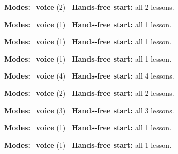 \expandafter\def\csname hlchaptermodality15\endcsname{%
  {\small\noindent
    \textbf{Modes:} \hlvoicesign{}~\textbf{voice} (2)\quad
    \hlvoicesign{}~\textbf{Hands-free start:} all 2 lessons.%
    \par}\medskip
}

\expandafter\def\csname hlchaptermodality16\endcsname{%
  {\small\noindent
    \textbf{Modes:} \hlvoicesign{}~\textbf{voice} (1)\quad
    \hlvoicesign{}~\textbf{Hands-free start:} all 1 lesson.%
    \par}\medskip
}

\expandafter\def\csname hlchaptermodality17\endcsname{%
  {\small\noindent
    \textbf{Modes:} \hlvoicesign{}~\textbf{voice} (1)\quad
    \hlvoicesign{}~\textbf{Hands-free start:} all 1 lesson.%
    \par}\medskip
}

\expandafter\def\csname hlchaptermodality18\endcsname{%
  {\small\noindent
    \textbf{Modes:} \hlvoicesign{}~\textbf{voice} (1)\quad
    \hlvoicesign{}~\textbf{Hands-free start:} all 1 lesson.%
    \par}\medskip
}

\expandafter\def\csname hlchaptermodality19\endcsname{%
  {\small\noindent
    \textbf{Modes:} \hlvoicesign{}~\textbf{voice} (4)\quad
    \hlvoicesign{}~\textbf{Hands-free start:} all 4 lessons.%
    \par}\medskip
}

\expandafter\def\csname hlchaptermodality20\endcsname{%
  {\small\noindent
    \textbf{Modes:} \hlvoicesign{}~\textbf{voice} (2)\quad
    \hlvoicesign{}~\textbf{Hands-free start:} all 2 lessons.%
    \par}\medskip
}

\expandafter\def\csname hlchaptermodality21\endcsname{%
  {\small\noindent
    \textbf{Modes:} \hlvoicesign{}~\textbf{voice} (3)\quad
    \hlvoicesign{}~\textbf{Hands-free start:} all 3 lessons.%
    \par}\medskip
}

\expandafter\def\csname hlchaptermodality22\endcsname{%
  {\small\noindent
    \textbf{Modes:} \hlvoicesign{}~\textbf{voice} (1)\quad
    \hlvoicesign{}~\textbf{Hands-free start:} all 1 lesson.%
    \par}\medskip
}

\expandafter\def\csname hlchaptermodality23\endcsname{%
  {\small\noindent
    \textbf{Modes:} \hlvoicesign{}~\textbf{voice} (1)\quad
    \hlvoicesign{}~\textbf{Hands-free start:} all 1 lesson.%
    \par}\medskip
}

